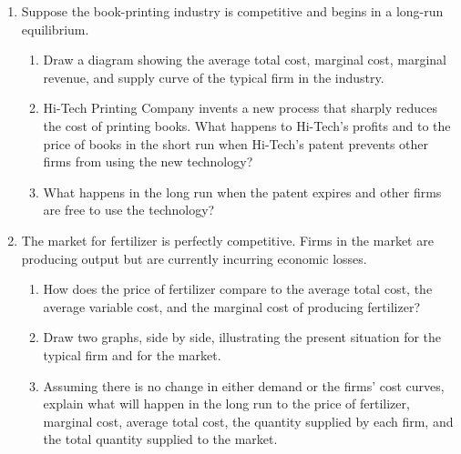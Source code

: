 \documentclass{article}
\begin{document}
\begin{enumerate}
\begin{enumerate}
	\end{enumerate}
	
\setcounter{enumi}{4}
\item Suppose the book-printing industry is competitive and begins in a long-run equilibrium.

	\begin{enumerate}
	
	\item Draw a diagram showing the average total cost, marginal cost, marginal revenue, and supply curve of the typical firm in the industry.
	
	\item Hi-Tech Printing Company invents a new process that sharply reduces the cost of printing books. What happens to Hi-Tech's profits and to the price of books in the short run when Hi-Tech's patent prevents other firms from using the new technology?
	
	\item What happens in the long run when the patent expires and other firms are free to use the technology?
	
	\end{enumerate}
	
\setcounter{enumi}{7}
\item The market for fertilizer is perfectly competitive. Firms in the market are producing output but are currently incurring economic losses.

	\begin{enumerate}
	
	\item How does the price of fertilizer compare to the average total cost, the average variable cost, and the marginal cost of producing fertilizer?
	
	\item Draw two graphs, side by side, illustrating the present situation for the typical firm and for the market.
	
	\item Assuming there is no change in either demand or the firms' cost curves, explain what will happen in the long run to the price of fertilizer, marginal cost, average total cost, the quantity supplied by each firm, and the total quantity supplied to the market.
	
	\end{enumerate}

\end{enumerate}
\end{document}
